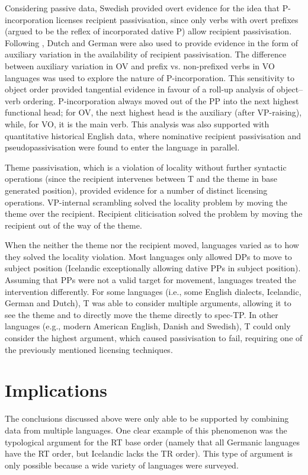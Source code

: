 Considering passive data, Swedish provided overt evidence for the idea that P-incorporation licenses recipient passivisation, since only verbs with overt prefixes (argued to be the reflex of incorporated dative P) allow recipient passivisation. Following \cite{Alexiadou.2014}, Dutch and German were also used to provide evidence in the form of auxiliary variation in the availability of recipient passivisation. The difference between auxiliary variation in OV and prefix vs. non-prefixed verbs in VO languages was used to explore the nature of P-incorporation. This sensitivity to object order provided tangential evidence in favour of a roll-up analysis of object--verb ordering. P-incorporation always moved out of the PP into the next highest functional head; for OV, the next highest head is the auxiliary (after VP-raising), while, for VO, it is the main verb. This analysis was also supported with quantitative historical English data, where nominative recipient passivisation and pseudopassivisation were found to enter the language in parallel.

Theme passivisation, which is a violation of locality without further syntactic operations (since the recipient intervenes between T and the theme in base generated position), provided evidence for a number of distinct licensing operations. VP-internal scrambling solved the locality problem by moving the theme over the recipient. Recipient cliticisation solved the problem by moving the recipient out of the way of the theme.

When the neither the theme nor the recipient moved, languages varied as to how they solved the locality violation. Most languages only allowed DPs to move to subject position (Icelandic exceptionally allowing dative PPs in subject position). Assuming that PPs were not a valid target for movement, languages treated the intervention differently. For some languages (i.e., some English dialects, Icelandic, German and Dutch), T was able to consider multiple arguments, allowing it to see the theme and to directly move the theme directly to spec-TP. In other languages (e.g., modern American English, Danish and Swedish), T could only consider the highest argument, which caused passivisation to fail, requiring one of the previously mentioned licensing techniques.

\section{Implications}
The conclusions discussed above were only able to be supported by combining data from multiple languages. One clear example of this phenomenon was the typological argument for the RT base order (namely that all Germanic languages have the RT order, but Icelandic lacks the TR order). This type of argument is only possible because a wide variety of languages were surveyed.

